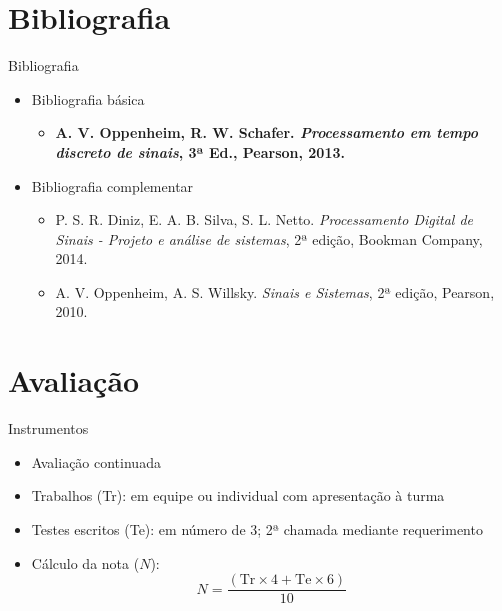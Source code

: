 \documentclass[
size=17pt,
paper=smartboard,
mode=present,
display=slidesnotes,
style=sailor,
nopagebreaks,
blackslide,
fleqn]{powerdot}
\begin{document}
   \section[ slide = false ]{Bibliografia}
      \begin{slide}[toc=]{Bibliografia}
         \begin{itemize}
            \item Bibliografia básica
            \begin{itemize}
               \item \textbf{A. V. Oppenheim, R. W. Schafer. \emph{Processamento 
em tempo discreto de sinais}, 3ª Ed., Pearson, 2013.}
            \end{itemize}
            \item Bibliografia complementar
            \begin{itemize}
               \item P. S. R. Diniz, E. A. B. Silva, S. L. Netto. \emph{Processamento 
               Digital de Sinais - Projeto e análise de sistemas}, 2ª edição, Bookman Company, 2014.
               \item A. V. Oppenheim, A. S. Willsky. \emph{Sinais e Sistemas}, 2ª edição, Pearson, 2010.
            \end{itemize}
         \end{itemize}
      \end{slide}

   \section[ slide = false ]{Avaliação}
      \begin{slide}[toc=]{Instrumentos}
         \begin{itemize}
            \item Avaliação continuada
            \item Trabalhos (Tr): em equipe ou individual com apresentação à turma
            \item Testes escritos (Te): em número de 3; 2ª chamada mediante requerimento
            \item Cálculo da nota ($N$):
            \begin{equation*}
               N=\frac{( \text{Tr} \times 4 + \text{Te} \times 6 )} {10}
            \end{equation*}
          \end{itemize}
      \end{slide}
      
\end{document}
